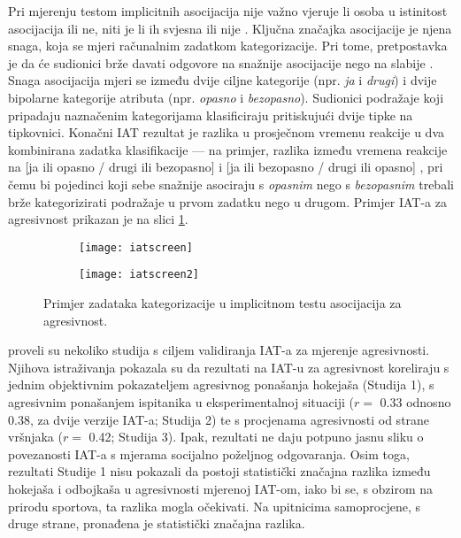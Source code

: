 \documentclass[a4paper, 12pt]{report}
\begin{document}
Pri mjerenju testom implicitnih asocijacija nije važno vjeruje li osoba 
u istinitost asocijacija ili ne, niti je li ih  svjesna ili nije \citep{wileyhandzgal}.
Ključna značajka asocijacije je njena snaga, koja se mjeri
računalnim zadatkom kategorizacije. Pri tome, pretpostavka je da će sudionici
brže davati odgovore na snažnije asocijacije nego na slabije
\citep{wileyhandzgal, greenwald1995implicit}. Snaga asocijacija  mjeri se između
dvije ciljne kategorije (npr. \emph{ja} i \emph{drugi}) i dvije bipolarne
kategorije atributa (npr. \emph{opasno} i \emph{bezopasno}).
Sudionici podražaje koji pripadaju naznačenim kategorijama klasificiraju pritiskujući dvije
tipke na tipkovnici. Konačni IAT rezultat je razlika u prosječnom vremenu
reakcije u dva kombinirana zadatka klasifikacije --- na primjer, razlika između
vremena reakcije na
[ja ili opasno / drugi ili bezopasno] i [ja ili bezopasno / drugi ili opasno]
\citep{richetin2008automatic}, pri čemu bi pojedinci koji sebe snažnije asociraju s
\emph{opasnim} nego s \emph{bezopasnim} trebali brže kategorizirati podražaje u
prvom zadatku nego u drugom. Primjer IAT-a za agresivnost prikazan je na slici
\ref{iatapic}.

\begin{figure}
    \centering
    \hspace*{-0.7cm}\begin{subfigure}{0.45\linewidth}
        \centering
        \texttt{[image: iatscreen]}
        \caption{}
        \end{subfigure}
        \hspace*{2em}
    \begin{subfigure}{0.45\linewidth}
        \centering
        \texttt{[image: iatscreen2]}
        \caption{}
        \end{subfigure}
        \vspace*{-0.6cm}
        \caption{\label{iatapic} Primjer zadataka kategorizacije u implicitnom testu asocijacija za
    agresivnost.}
\end{figure}

\citet{banse2015predicting} proveli su nekoliko studija s ciljem validiranja
IAT-a za mjerenje agresivnosti.
Njihova  istraživanja pokazala su da rezultati na IAT-u za
agresivnost koreliraju s jednim objektivnim pokazateljem agresivnog ponašanja
hokejaša (Studija 1), s agresivnim ponašanjem ispitanika u eksperimentalnoj situaciji ($r =$
0.33 odnosno 0.38, za dvije verzije IAT-a; Studija 2) te s procjenama
agresivnosti od strane vršnjaka ($r =$ 0.42; Studija 3).
Ipak, rezultati ne daju potpuno jasnu sliku o povezanosti IAT-a s mjerama
socijalno poželjnog odgovaranja. Osim toga, rezultati Studije 1 nisu pokazali da postoji
statistički značajna razlika između hokejaša i odbojkaša u agresivnosti mjerenoj
IAT-om, iako bi se, s obzirom na prirodu sportova, ta razlika mogla očekivati. 
Na upitnicima samoprocjene, s druge strane, pronađena je statistički značajna
razlika.
\end{document}
